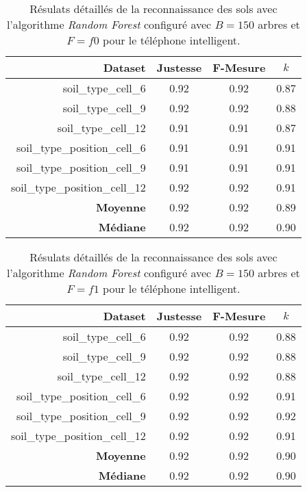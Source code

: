 \begin{table}[H]\renewcommand{\arraystretch}{0.5}
	\centering
	\caption{Résulats détaillés de la reconnaissance des sols avec l'algorithme \textit{Random Forest} configuré avec $B=150$ arbres et $F=f0$ pour le téléphone intelligent.}
	\label{tab:rf-150-f0-cell}
	\begin{tabular}{@{}rccc@{}}
		\toprule
			\textbf{Dataset} & \textbf{Justesse} & \textbf{F-Mesure} & \textbf{$k$} \\
		\midrule
			soil\_type\_cell\_6 & 0.92 & 0.92 & 0.87 \\
			soil\_type\_cell\_9 & 0.92 & 0.92 & 0.88 \\
			soil\_type\_cell\_12 & 0.91 & 0.91 & 0.87 \\
			soil\_type\_position\_cell\_6 & 0.91 & 0.91 & 0.91 \\
			soil\_type\_position\_cell\_9 & 0.91 & 0.91 & 0.91 \\
			soil\_type\_position\_cell\_12 & 0.92 & 0.92 & 0.91 \\
			\textbf{Moyenne} & 0.92 & 0.92 & 0.89 \\
			\textbf{Médiane} & 0.92 & 0.92 & 0.90 \\
		\bottomrule
	\end{tabular}
\end{table}

\begin{table}[H]\renewcommand{\arraystretch}{0.5}
	\centering
	\caption{Résulats détaillés de la reconnaissance des sols avec l'algorithme \textit{Random Forest} configuré avec $B=150$ arbres et $F=f1$ pour le téléphone intelligent.}
	\label{tab:rf-150-f1-cell}
	\begin{tabular}{@{}rccc@{}}
		\toprule
			\textbf{Dataset} & \textbf{Justesse} & \textbf{F-Mesure} & \textbf{$k$} \\
		\midrule
			soil\_type\_cell\_6 & 0.92 & 0.92 & 0.88 \\
			soil\_type\_cell\_9 & 0.92 & 0.92 & 0.88 \\
			soil\_type\_cell\_12 & 0.92 & 0.92 & 0.88 \\
			soil\_type\_position\_cell\_6 & 0.92 & 0.92 & 0.91 \\
			soil\_type\_position\_cell\_9 & 0.92 & 0.92 & 0.92 \\
			soil\_type\_position\_cell\_12 & 0.92 & 0.92 & 0.91 \\
			\textbf{Moyenne} & 0.92 & 0.92 & 0.90 \\
			\textbf{Médiane} & 0.92 & 0.92 & 0.90 \\
		\bottomrule
	\end{tabular}
\end{table}

